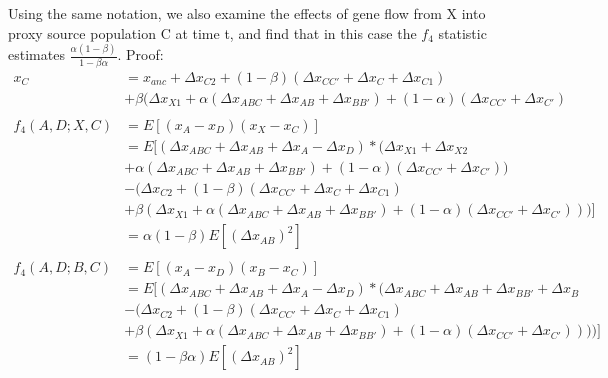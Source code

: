 \documentclass[12pt]{report}
\begin{document}
\begin{enumerate}
	Using the same notation, we also examine the effects of gene flow from X into proxy source population C at time t, and find that in this case the $f_4$ statistic estimates $\frac{\alpha(1 - \beta)}{1 - \beta\alpha}$. Proof:
	\begin{align*}
	x_C &= x_{anc} + \Delta{x_{C2}} + (1 - \beta)(\Delta{x_{CC'}} + \Delta{x_{C}} + \Delta{x_{C1}})\\
	&+ \beta(\Delta{x_{X1}} + \alpha(\Delta{x_{ABC}} + \Delta{x_{AB}} + \Delta{x_{BB'}}) + (1 - \alpha)(\Delta{x_{CC'}} + \Delta{x_{C'}})\\
	\\
	f_4(A,D;X,C) &= E[(x_A - x_D)(x_X - x_C)] \\
	&= E[(\Delta{x_{ABC}} + \Delta{x_{AB}} + \Delta{x_{A}} - \Delta{x_{D}})*(\Delta{x_{X1}} + \Delta{x_{X2}} \\
	&+ \alpha(\Delta{x_{ABC}} + \Delta{x_{AB}} + \Delta{x_{BB'}}) + (1 - \alpha)(\Delta{x_{CC'}} + \Delta{x_{C'}})) \\
	&- (\Delta{x_{C2}} + (1 - \beta)(\Delta{x_{CC'}} + \Delta{x_{C}} + \Delta{x_{C1}})\\
	&+ \beta(\Delta{x_{X1}} + \alpha(\Delta{x_{ABC}} + \Delta{x_{AB}} + \Delta{x_{BB'}}) + (1 - \alpha)(\Delta{x_{CC'}} + \Delta{x_{C'}})))]\\
	&=\alpha(1 - \beta)E[(\Delta{x_{AB}})^2]\\
	\\
	f_4(A,D;B,C) &= E[(x_A - x_D)(x_B - x_C)] \\
	&= E[(\Delta{x_{ABC}} + \Delta{x_{AB}} + \Delta{x_{A}} - \Delta{x_{D}})*(\Delta{x_{ABC}} + \Delta{x_{AB}} + \Delta{x_{BB'}} + \Delta{x_{B}} \\
	& - (\Delta{x_{C2}} + (1 - \beta)(\Delta{x_{CC'}} + \Delta{x_{C}} + \Delta{x_{C1}})\\
	&+ \beta(\Delta{x_{X1}} + \alpha(\Delta{x_{ABC}} + \Delta{x_{AB}} + \Delta{x_{BB'}}) + (1 - \alpha)(\Delta{x_{CC'}} + \Delta{x_{C'}}))))]\\
	&=(1 - \beta\alpha)E[(\Delta{x_{AB}})^2]
	\end{align*}
	

\end{enumerate}
\end{document}
